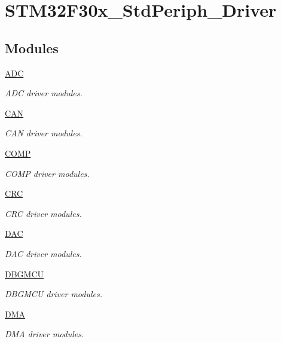 \hypertarget{group___s_t_m32_f30x___std_periph___driver}{\section{S\-T\-M32\-F30x\-\_\-\-Std\-Periph\-\_\-\-Driver}
\label{group___s_t_m32_f30x___std_periph___driver}
}
\subsection*{Modules}
\begin{DoxyCompactItemize}
\item 
\hyperlink{group___a_d_c}{A\-D\-C}
\begin{DoxyCompactList}\small\item\em A\-D\-C driver modules. \end{DoxyCompactList}\item 
\hyperlink{group___c_a_n}{C\-A\-N}
\begin{DoxyCompactList}\small\item\em C\-A\-N driver modules. \end{DoxyCompactList}\item 
\hyperlink{group___c_o_m_p}{C\-O\-M\-P}
\begin{DoxyCompactList}\small\item\em C\-O\-M\-P driver modules. \end{DoxyCompactList}\item 
\hyperlink{group___c_r_c}{C\-R\-C}
\begin{DoxyCompactList}\small\item\em C\-R\-C driver modules. \end{DoxyCompactList}\item 
\hyperlink{group___d_a_c}{D\-A\-C}
\begin{DoxyCompactList}\small\item\em D\-A\-C driver modules. \end{DoxyCompactList}\item 
\hyperlink{group___d_b_g_m_c_u}{D\-B\-G\-M\-C\-U}
\begin{DoxyCompactList}\small\item\em D\-B\-G\-M\-C\-U driver modules. \end{DoxyCompactList}\item 
\hyperlink{group___d_m_a}{D\-M\-A}
\begin{DoxyCompactList}\small\item\em D\-M\-A driver modules. \end{DoxyCompactList}\item 

\end{DoxyCompactItemize}

